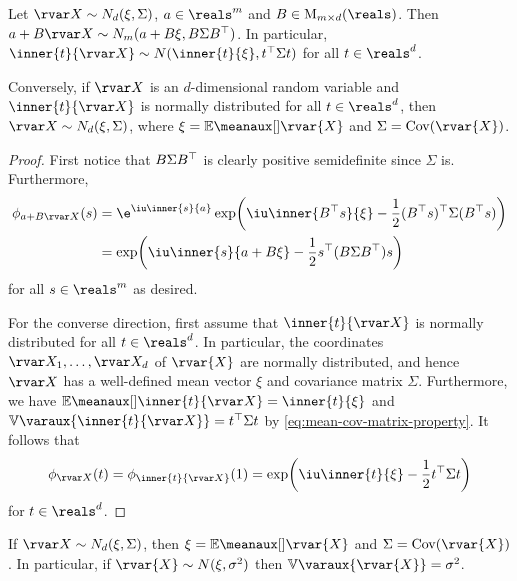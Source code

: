 \documentclass[article, a4paper, 11pt, oneside]{memoir}
\numberwithin{equation}{chapter}
\begin{document}
\renewcommand{\var}[1]{\mathbb{V}\varaux{#1}}

\begin{proposition}
    \label{thm:multivariate-normal-transform}
    Let $\rvar X \sim N_d(\xi, \Sigma)$, $a \in \reals^m$ and $B \in \mat_{m \times d}(\reals)$. Then $a + B \rvar X \sim N_m(a + B\xi, B \Sigma B\trans)$. In particular, $\inner{t}{\rvar X} \sim N(\inner{t}{\xi}, t\trans \Sigma t)$ for all $t \in \reals^d$.

    Conversely, if $\rvar X$ is an $d$-dimensional random variable and $\inner{t}{\rvar X}$ is normally distributed for all $t \in \reals^d$, then $\rvar X \sim N_d(\xi,\Sigma)$, where $\xi = \mean{\rvar{X}}$ and $\Sigma = \cov(\rvar{X})$.
\end{proposition}

\begin{proof}
    First notice that $B \Sigma B^{\top}$ is clearly positive semidefinite since $\Sigma$ is. Furthermore,
    \begin{align*}
        \phi_{a+B \rvar X}(s)
            &= \e^{\iu \inner{s}{a}} \exp \biggl( \iu \inner{B\trans s}{\xi} - \frac{1}{2} (B\trans s)\trans \Sigma (B\trans s) \biggr) \\
            &= \exp \biggl( \iu \inner{s}{a + B\xi} - \frac{1}{2} s\trans (B \Sigma B\trans) s \biggr)
    \end{align*}
    for all $s \in \reals^m$ as desired.

    For the converse direction, first assume that $\inner{t}{\rvar X}$ is normally distributed for all $t \in \reals^d$. In particular, the coordinates $\rvar X_1, \ldots, \rvar X_d$ of $\rvar{X}$ are normally distributed, and hence $\rvar X$ has a well-defined mean vector $\xi$ and covariance matrix $\Sigma$. Furthermore, we have $\mean{\inner{t}{\rvar X}} = \inner{t}{\xi}$ and $\var{\inner{t}{\rvar X}} = t\trans \Sigma t$ by \cref{eq:mean-cov-matrix-property}. It follows that
    \begin{equation*}
        \phi_{\rvar X}(t)
            = \phi_{\inner{t}{\rvar X}}(1)
            = \exp \biggl( \iu \inner{t}{\xi} - \frac{1}{2} t\trans \Sigma t \biggr)
    \end{equation*}
    for $t \in \reals^d$.
\end{proof}


\begin{corollary}
    If $\rvar X \sim N_d(\xi, \Sigma)$, then $\xi = \mean{\rvar{X}}$ and $\Sigma = \cov(\rvar{X})$. In particular, if $\rvar{X} \sim N(\xi,\sigma^2)$ then $\var{\rvar{X}} = \sigma^2$.
\end{corollary}
\end{document}
